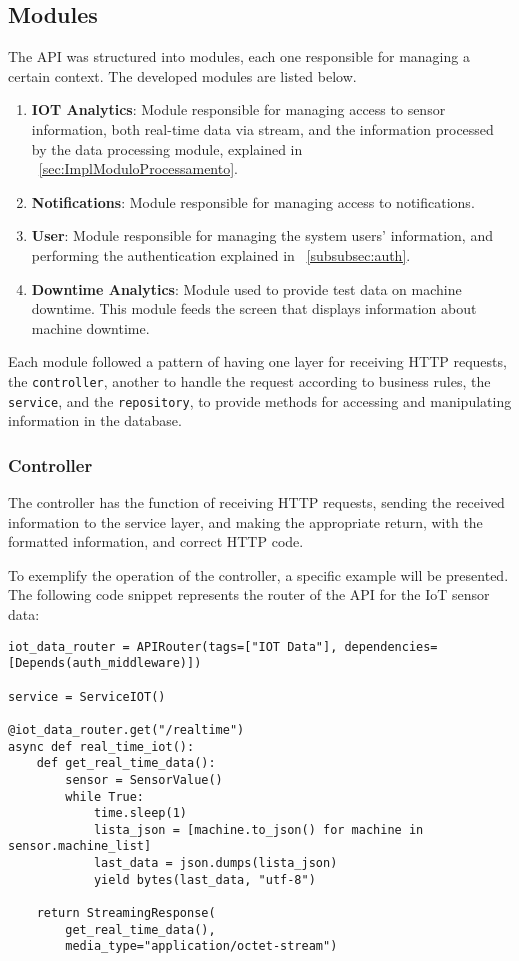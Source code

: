 \subsection{Modules}\label{subsec:modules}
The \gls{API} was structured into modules, each one responsible for managing a certain context. The developed modules are listed below.

\begin{enumerate}
    \item \textbf{IOT Analytics}: Module responsible for managing access to sensor information, both real-time data via stream, and the information processed by the data processing module, explained in ~\ref{sec:ImplModuloProcessamento}.
    \item \textbf{Notifications}: Module responsible for managing access to notifications.
    \item \textbf{User}: Module responsible for managing the system users' information, and performing the authentication explained in ~\ref{subsubsec:auth}.
    \item \textbf{Downtime Analytics}: Module used to provide test data on machine downtime. This module feeds the screen that displays information about machine downtime.
\end{enumerate}

Each module followed a pattern of having one layer for receiving \gls{HTTP} requests, the \texttt{controller}, another to handle the request according to business rules, the \texttt{service}, and the \texttt{repository}, to provide methods for accessing and manipulating information in the database.

\subsubsection{Controller}\label{subsubsec:controller}
The controller has the function of receiving \gls{HTTP} requests, sending the received information to the service layer, and making the appropriate return, with the formatted information, and correct \gls{HTTP} code.

To exemplify the operation of the controller, a specific example will be presented. The following code snippet represents the router of the \gls{API} for the \gls{IoT} sensor data:

\begin{Verbatim}[fontsize=\small, baselinestretch=0.6]
iot_data_router = APIRouter(tags=["IOT Data"], dependencies=[Depends(auth_middleware)])

service = ServiceIOT()

@iot_data_router.get("/realtime")
async def real_time_iot(): 
    def get_real_time_data():
        sensor = SensorValue()
        while True:
            time.sleep(1)
            lista_json = [machine.to_json() for machine in sensor.machine_list]
            last_data = json.dumps(lista_json)
            yield bytes(last_data, "utf-8")

    return StreamingResponse(
        get_real_time_data(),
        media_type="application/octet-stream")
\end{Verbatim}

